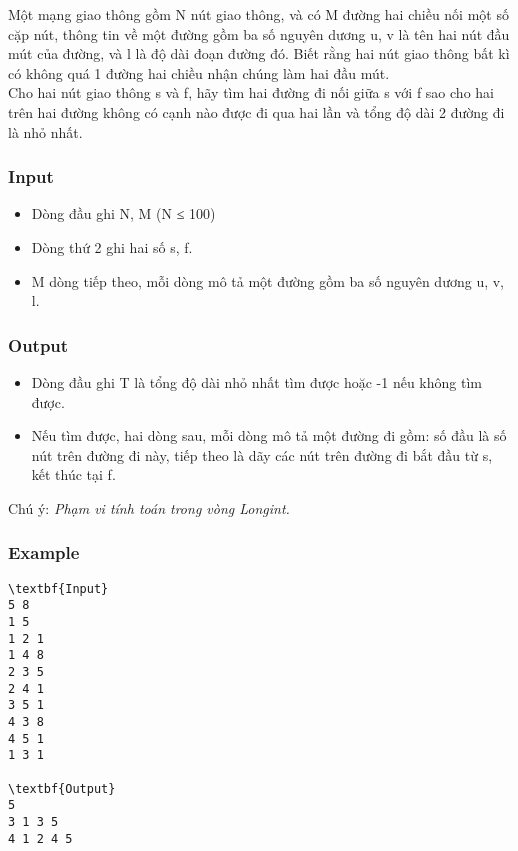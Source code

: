 

Một mạng giao thông gồm N nút giao thông, và có M đường hai chiều nối một số cặp nút, thông tin về một đường gồm ba số nguyên dương u, v là tên hai nút đầu mút của đường, và l là độ dài đoạn đường đó. Biết rằng hai nút giao thông bất kì có không quá 1 đường hai chiều nhận chúng làm hai đầu mút.
\\Cho hai nút giao thông s và f, hãy tìm hai đường đi nối giữa s với f sao cho hai trên hai đường không có cạnh nào được đi qua hai lần và tổng độ dài 2 đường đi là nhỏ nhất.

\subsubsection{Input}
\begin{itemize}
	\item Dòng đầu ghi N, M (N ≤ 100)
	\item Dòng thứ 2 ghi hai số s, f.
	\item M dòng tiếp theo, mỗi dòng mô tả một đường gồm ba số nguyên dương u, v, l.
\end{itemize}

\subsubsection{Output}
\begin{itemize}
	\item Dòng đầu ghi T là tổng độ dài nhỏ nhất tìm được hoặc -1 nếu không tìm được.
	\item Nếu tìm được, hai dòng sau, mỗi dòng mô tả một đường đi gồm: số đầu là số nút trên đường đi này, tiếp theo là dãy các nút trên đường đi bắt đầu từ s, kết thúc tại f.
\end{itemize}

Chú ý: \emph{ Phạm vi tính toán trong vòng Longint. }

\subsubsection{Example}
\begin{verbatim}
\textbf{Input}
5 8
1 5
1 2 1
1 4 8
2 3 5
2 4 1
3 5 1
4 3 8
4 5 1
1 3 1

\textbf{Output}
5
3 1 3 5 
4 1 2 4 5
\end{verbatim}